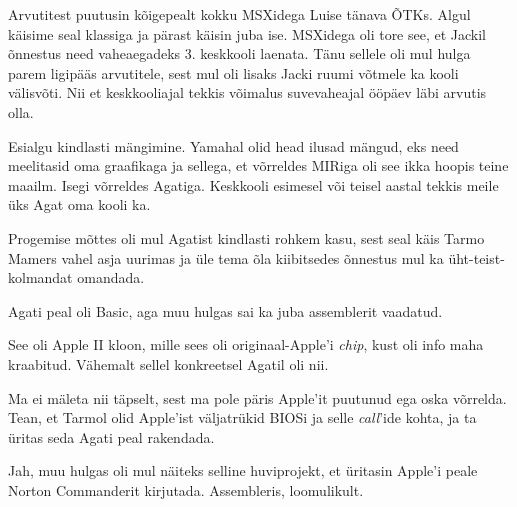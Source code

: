 Arvutitest puutusin kõigepealt kokku MSXidega Luise tänava ÕTKs. 
Algul käisime seal klassiga ja pärast käisin juba ise. 
MSXidega oli tore see, et Jackil õnnestus need 
vaheaegadeks 3. keskkooli laenata. Tänu sellele oli mul hulga parem ligipääs arvutitele, sest mul oli lisaks Jacki ruumi võtmele ka kooli välisvõti. Nii et
keskkooliajal tekkis võimalus suvevaheajal ööpäev läbi arvutis olla.


Esialgu kindlasti mängimine. Yamahal olid head ilusad mängud, eks need meelitasid 
oma graafikaga ja sellega, et võrreldes MIRiga oli see ikka hoopis teine maailm. 
Isegi võrreldes Agatiga. Keskkooli 
esimesel või teisel aastal tekkis meile üks Agat oma kooli ka. 

Progemise mõttes oli mul Agatist kindlasti rohkem kasu, sest seal käis 
Tarmo Mamers vahel asja 
uurimas ja üle tema õla kiibitsedes õnnestus mul ka üht-teist-kolmandat 
omandada.

Agati peal oli Basic, aga muu hulgas sai ka juba assemblerit 
vaadatud.


See oli Apple II kloon, mille sees oli originaal-Apple'i \emph{chip}, kust oli info maha kraabitud. Vähemalt sellel konkreetsel Agatil oli 
nii.


Ma ei mäleta nii täpselt, sest ma pole päris Apple'it puutunud ega oska võrrelda. Tean, et Tarmol olid Apple'ist 
väljatrükid BIOSi ja selle \emph{call}'ide kohta, ja ta üritas seda 
Agati peal rakendada.


Jah, muu hulgas oli mul näiteks selline huviprojekt, et üritasin
Apple'i peale Norton Commanderit kirjutada. 
Assembleris, loomulikult.


